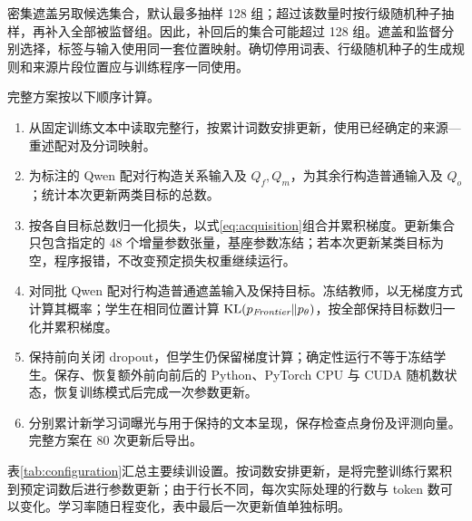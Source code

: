 密集遮盖另取候选集合，默认最多抽样 128 组；超过该数量时按行级随机种子抽样，再补入全部被监督组。因此，补回后的集合可能超过 128 组。遮盖和监督分别选择，标签与输入使用同一套位置映射。确切停用词表、行级随机种子的生成规则和来源片段位置应与训练程序一同使用。

完整方案按以下顺序计算。

\begin{enumerate}
\item 从固定训练文本中读取完整行，按累计词数安排更新，使用已经确定的来源—重述配对及分词映射。
\item 为标注的 Qwen 配对行构造关系输入及 $Q_f,Q_m$，为其余行构造普通输入及 $Q_o$；统计本次更新两类目标的总数。
\item 按各自目标总数归一化损失，以式\eqref{eq:acquisition}组合并累积梯度。更新集合只包含指定的 48 个增量参数张量，基座参数冻结；若本次更新某类目标为空，程序报错，不改变预定损失权重继续运行。
\item 对同批 Qwen 配对行构造普通遮盖输入及保持目标。冻结教师，以无梯度方式计算其概率；学生在相同位置计算 $\operatorname{KL}(p_{\textit{Frontier}}\|p_\theta)$，按全部保持目标数归一化并累积梯度。
\item 保持前向关闭 dropout，但学生仍保留梯度计算；确定性运行不等于冻结学生。保存、恢复额外前向前后的 Python、PyTorch CPU 与 CUDA 随机数状态，恢复训练模式后完成一次参数更新。
\item 分别累计新学习词曝光与用于保持的文本呈现，保存检查点身份及评测向量。完整方案在 80 次更新后导出。
\end{enumerate}

表\ref{tab:configuration}汇总主要续训设置。按词数安排更新，是将完整训练行累积到预定词数后进行参数更新；由于行长不同，每次实际处理的行数与 token 数可以变化。学习率随日程变化，表中最后一次更新值单独标明。

